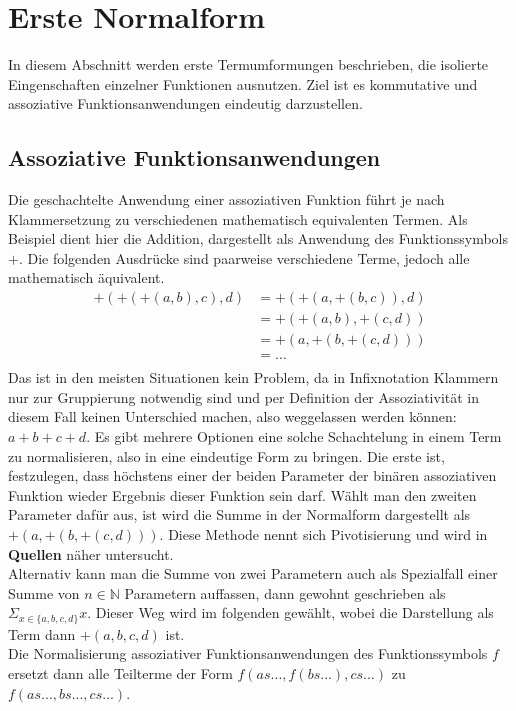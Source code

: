 \documentclass{article}
\begin{document}
\section {Erste Normalform}
In diesem Abschnitt werden erste Termumformungen beschrieben, die isolierte Eingenschaften einzelner Funktionen ausnutzen. Ziel ist es kommutative und assoziative Funktionsanwendungen eindeutig darzustellen.\\

\subsection {Assoziative Funktionsanwendungen}
Die geschachtelte Anwendung einer assoziativen Funktion führt je nach Klammersetzung zu verschiedenen mathematisch equivalenten Termen. Als Beispiel dient hier die Addition, dargestellt als Anwendung des Funktionssymbols $+$. Die folgenden Ausdrücke sind paarweise verschiedene Terme, jedoch alle mathematisch äquivalent.
\begin{equation}
	\begin{split}
	+(+(+(a, b), c), d) &= +(+(a, +(b, c)), d)\\
	&= +(+(a, b), +(c, d))\\
	&= +(a, +(b, +(c, d)))\\
	&= \dots \\
	\end{split}
\end{equation}
Das ist in den meisten Situationen kein Problem, da in Infixnotation Klammern nur zur Gruppierung notwendig sind und per Definition der Assoziativität in diesem Fall keinen Unterschied machen, also weggelassen werden können: $a + b + c + d$. Es gibt mehrere Optionen eine solche Schachtelung in einem Term zu normalisieren, also in eine eindeutige Form zu bringen. Die erste ist, festzulegen, dass höchstens einer der beiden Parameter der binären assoziativen Funktion wieder Ergebnis dieser Funktion sein darf. Wählt man den zweiten Parameter dafür aus, ist wird die Summe in der Normalform dargestellt als $+(a, +(b, +(c, d)))$. Diese Methode nennt sich Pivotisierung und wird in \textbf{Quellen} näher untersucht.\\
Alternativ kann man die Summe von zwei Parametern auch als Spezialfall einer Summe von $n \in \mathbb{N}$ Parametern auffassen, dann gewohnt geschrieben als $\Sigma_{x \in \{a, b, c, d\}} x$. Dieser Weg wird im folgenden gewählt, wobei die Darstellung als Term dann $+(a, b, c, d)$ ist. \\
Die Normalisierung assoziativer Funktionsanwendungen des Funktionssymbols $f$ ersetzt dann alle Teilterme der Form $f(as..., f(bs...), cs...)$ zu $f(as..., bs..., cs...)$.
\end{document}

